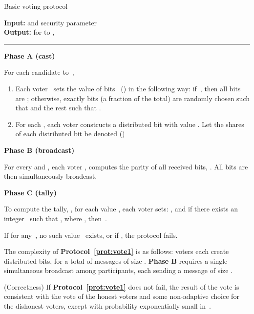 \documentclass[runningheads]{llncs}
\begin{document}
\begin{protocol}[h]
\caption{Basic voting protocol} \label{prot:vote1}
{\bf Input:} 
and security parameter  \\
{\bf Output:} for  to , 

\vspace{4pt} \hrule \vspace{4pt}

\textbf{Phase A (cast)}

For each candidate  to~, \vspace{-.25cm}
\begin{enumerate}
\item
Each voter~ sets the value of  bits~ () in the following way: if~, then all bits
are ; otherwise, exactly  bits (a fraction  of the
total) are randomly chosen such that  and the rest such
that .

\item
For each , each voter  constructs a
distributed bit  with value . Let the shares of each
distributed bit be denoted  ()
\end{enumerate}

\textbf{Phase B (broadcast)}

For every  and , each voter , computes the parity of all
received bits, . All bits
are then simultaneously broadcast.

\textbf{Phase C (tally)}

To compute the tally, , for each value , each
voter sets: \mbox{},
\mbox{} and  if
there exists an integer~ such that , where , then \,.

If for any~, no such value~ exists, or if , the protocol fails.

\end{protocol}

The complexity of \textbf{Protocol~\ref{prot:vote1}} is as follows:
 voters each create  distributed bits, for a total of 
messages of size . \textbf{Phase B} requires a single
simultaneous broadcast among  participants, each sending a
message of size .

\begin{lemma}(Correctness)
\label{lem:correctness corrupt} If
\textbf{Protocol~\ref{prot:vote1}} does not fail, the result of the
vote is consistent with the vote of the honest voters and some
non-adaptive choice for the dishonest voters, except with
probability exponentially small in~.
\end{lemma}
\end{document}

